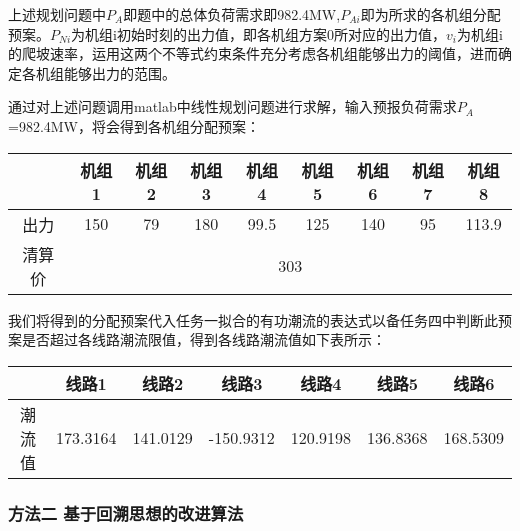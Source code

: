\documentclass[12pt,a4paper]{ctexart}
\begin{document}
	上述规划问题中$P_{A}$即题中的总体负荷需求即982.4MW,$P_{Ai}$即为所求的各机组分配预案。$P_{Ni}$为机组i初始时刻的出力值，即各机组方案0所对应的出力值，$v_{i}$为机组i的爬坡速率，运用这两个不等式约束条件充分考虑各机组能够出力的阈值，进而确定各机组能够出力的范围。
	
	通过对上述问题调用matlab中线性规划问题进行求解，输入预报负荷需求$P_{A}$=982.4MW，将会得到各机组分配预案：
	
	
	
	
	
	
	\begin{table}[htbp]
	\begin{tabular}{|c|c|c|c|c|c|c|c|c|}
		\hline
		{}    & {机组1} & {机组2} & {机组3} & {机组4} & {机组5} & {机组6} & {机组7} & {机组8} \\ \hline
		{出力}  & 150          & 79           & 180          & 99.5         & 125          & 140          & 95           & 113.9        \\ \hline
		{清算价} & \multicolumn{8}{c|}{303}                                                                                              \\ \hline
	\end{tabular}
	\end{table}

我们将得到的分配预案代入任务一拟合的有功潮流的表达式以备任务四中判断此预案是否超过各线路潮流限值，得到各线路潮流值如下表所示：

\vspace{1em}

\begin{adjustbox}{center}
	\begin{tabular}{|c|c|c|c|c|c|c|}
		\hline
		\centering
		& {线路1} & {线路2} & {线路3} & {线路4} & {线路5} & {线路6} \\ \hline
		{潮流值} & 173.3164 &141.0129&-150.9312& 120.9198& 136.8368& 168.5309      \\ \hline
	\end{tabular}
\end{adjustbox}


	\subsubsection*{方法二 \space 基于回溯思想的改进算法}
	
\end{document}
